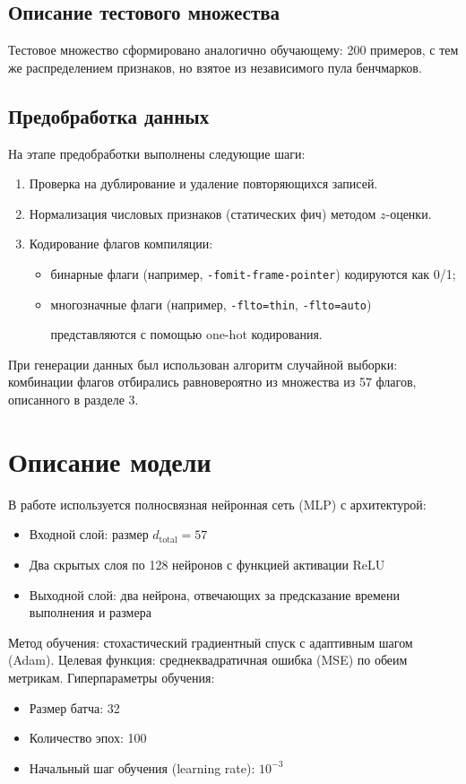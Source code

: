 \documentclass[a4paper,12pt]{article}
\begin{document}
\subsection{Описание тестового множества}
Тестовое множество сформировано аналогично обучающему: 200 примеров, с тем же распределением признаков, но взятое из независимого пула бенчмарков.

\subsection{Предобработка данных}
На этапе предобработки выполнены следующие шаги:
\begin{enumerate}
  \item Проверка на дублирование и удаление повторяющихся записей.
  \item Нормализация числовых признаков (статических фич) методом $z$-оценки.
  \item Кодирование флагов компиляции:
    \begin{itemize}
      \item бинарные флаги (например, \texttt{-fomit-frame-pointer}) кодируются как 0/1;
      \item многозначные флаги (например, \texttt{-flto=thin}, \texttt{-flto=auto})

        представляются с помощью one-hot кодирования.
    \end{itemize}
\end{enumerate}

При генерации данных был использован алгоритм случайной выборки: комбинации флагов
отбирались равновероятно из множества из 57 флагов, описанного в разделе 3.

\section{Описание модели}
В работе используется полносвязная нейронная сеть (MLP) с архитектурой:
\begin{itemize}
  \item Входной слой: размер $d_{\text{total}}=57$
  \item Два скрытых слоя по 128 нейронов с функцией активации ReLU
  \item Выходной слой: два нейрона, отвечающих за предсказание времени выполнения и размера
\end{itemize}

Метод обучения: стохастический градиентный спуск с адаптивным шагом (Adam).
Целевая функция: среднеквадратичная ошибка (MSE) по обеим метрикам. Гиперпараметры обучения:
\begin{itemize}
  \item Размер батча: 32
  \item Количество эпох: 100
  \item Начальный шаг обучения (learning rate): $10^{-3}$
\end{itemize}
\end{document}
